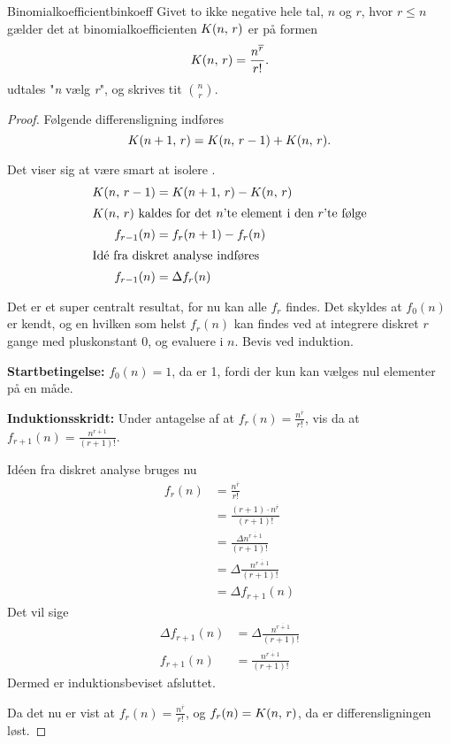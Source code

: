 \documentclass{article}
\begin{document}
\begin{theorem}{Binomialkoefficient}{binkoeff}
    Givet to ikke negative hele tal, $n$ og $r$, hvor $r \le n$ gælder det at
    binomialkoefficienten $\nobreak{K(n,\,r)}$ er på formen
    \[
        \nobreak{K(n,\,r)} = \frac{n^{\overline{r}}}{r!}.
    \] 
     udtales "\textit{n} vælg \textit{r}", og skrives tit
    $\binom{n}{r}$.
\end{theorem}

\begin{proof}
Følgende differensligning indføres
\[
    \nobreak{K(n+1,\,r)} = \nobreak{K(n,\,r-1)} + \nobreak{K(n,\,r)}.
\] 

Det viser sig at være smart at isolere .
\begin{align*}
    \nobreak{K(n,\,r-1)} &= \nobreak{K(n+1,\,r)} - \nobreak{K(n,\,r)}\\
    \intertext{\ensuremath{\nobreak{K(n,\,r)}} kaldes for det $n$'te element i den $r$'te følge}
    f_{r-1}(n) &= f_{r}(n+1) - f_{r}(n)\\
    \intertext{Idé fra diskret analyse indføres}
    f_{r-1}(n) &= \Delta f_{r}(n)
\end{align*}

Det er et super centralt resultat, for nu kan alle $f_{r}$ findes. Det skyldes
at $f_0(n)$ er kendt, og en hvilken som helst $f_r(n)$ kan findes ved at
integrere diskret $r$ gange med pluskonstant 0, og evaluere i $n$. Bevis ved
induktion.

\smallskip

\textbf{Startbetingelse:} $f_0(n) = 1$, da  er 1, fordi der kun kan
vælges nul elementer på en måde.

\textbf{Induktionsskridt:} Under antagelse af at $f_r(n) =
\frac{n^{\overline{r}}}{r!}$, vis da at $f_{r+1}(n)
=\frac{n^{\overline{r+1}}}{(r+1)!}$.

Idéen fra diskret analyse bruges nu
\begin{align*}
    f_{r}(n) 
       &= \frac{n^{\overline{r}}}{r!}\\
       &= \frac{(r+1) \cdot n^{\overline{r}}}{(r+1)!}\\
       &= \frac{\Delta n^{\overline{r+1}}}{(r+1)!}\\
       &= \Delta\frac{n^{\overline{r+1}}}{(r+1)!}\\
       &= \Delta f_{r+1}(n)
\end{align*}
Det vil sige
\begin{align*}
    \Delta f_{r+1}(n) &= \Delta\frac{n^{\overline{r+1}}}{(r+1)!}\\
    f_{r+1}(n) &= \frac{n^{\overline{r+1}}}{(r+1)!}
\end{align*}
Dermed er induktionsbeviset afsluttet.

\smallskip

Da det nu er vist at $f_r(n) = \frac{n^{\overline{r}}}{r!}$, og $f_r(n) =
\nobreak{K(n,\,r)}$, da er differensligningen løst.
\end{proof}
\end{document}
